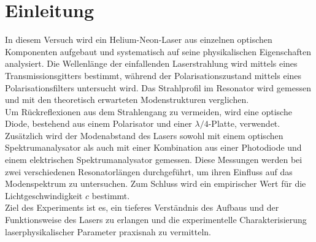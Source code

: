 \chapter{Einleitung}
In diesem Versuch wird ein Helium-Neon-Laser aus einzelnen optischen Komponenten aufgebaut und systematisch auf seine physikalischen Eigenschaften analysiert. Die Wellenlänge der einfallenden Laserstrahlung wird mittels eines Transmissionsgitters bestimmt, während der Polarisationszustand mittels eines Polarisationsfilters untersucht wird. Das Strahlprofil im Resonator wird gemessen und mit den theoretisch erwarteten Modenstrukturen verglichen.\\
Um Rückreflexionen aus dem Strahlengang zu vermeiden, wird eine optische Diode, bestehend aus einem Polarisator und einer $\lambda/4$-Platte, verwendet. Zusätzlich wird der Modenabstand des Lasers sowohl mit einem optischen Spektrumanalysator als auch mit einer Kombination aus einer Photodiode und einem elektrischen Spektrumanalysator gemessen. Diese Messungen werden bei zwei verschiedenen Resonatorlängen durchgeführt, um ihren Einfluss auf das Modenspektrum zu untersuchen. Zum Schluss wird ein empirischer Wert für die Lichtgeschwindigkeit $c$ bestimmt.\\
Ziel des Experiments ist es, ein tieferes Verständnis des Aufbaus und der Funktionsweise des Lasers zu erlangen und die experimentelle Charakterisierung laserphysikalischer Parameter praxisnah zu vermitteln.
